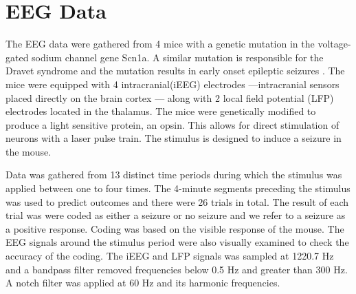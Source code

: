 

\section{EEG Data}

The EEG data were gathered from 4 mice with a genetic 
mutation in the voltage-gated sodium channel gene Scn1a. 
A similar mutation is responsible for the Dravet syndrome 
and the mutation results in early onset epileptic seizures \cite{ito2013}.
The mice were equipped with 4 intracranial(iEEG) electrodes ---intracranial sensors placed directly on the brain cortex ---  
along with 2 local field potential (LFP) electrodes located 
 in the thalamus. The mice were genetically modified to produce a 
 light sensitive protein, an opsin. This allows for direct 
 stimulation of neurons with a laser pulse train. The stimulus is designed to induce a seizure in the mouse.
 

Data was gathered from 13 distinct time periods during which the 
stimulus was applied between one to four times. 
The 4-minute segments preceding the stimulus was used 
to predict outcomes and there were 26 trials in total.
 The result of each trial was were coded as either a seizure 
 or no seizure and we refer to a seizure as a positive response. 
Coding was based on the visible response of the 
mouse. The EEG signals around the stimulus period were also visually examined to check the accuracy of the coding.
The iEEG and LFP signals was sampled at 1220.7 Hz and
a bandpass filter removed frequencies below 0.5 Hz and greater
than 300 Hz. A notch filter was applied at 60 Hz and its harmonic frequencies. 


